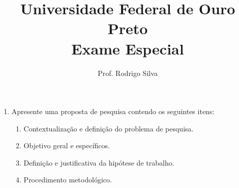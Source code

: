 \documentclass{article}
\title{\vspace{-2 cm}Universidade Federal de Ouro Preto \\ Exame Especial}
\author{Prof. Rodrigo Silva}
\date{}
\begin{document}
\maketitle


\begin{enumerate}
\item Apresente uma proposta de pesquisa contendo os seguintes itens:

\begin{enumerate}
    \item Contextualização e definição do problema de pesquisa.
    \item Objetivo geral e específicos.
    \item Definição e justificativa da hipótese de trabalho.
    \item Procedimento metodológico.
\end{enumerate} 

\end{enumerate}


%
%
\end{document}
